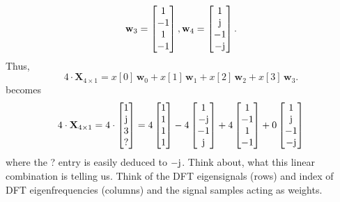 \documentclass[11pt,a4paper,DIV=12]{scrartcl}
\begin{document}
\begin{Loesung}
\begin{enumerate}[label=\alph*)]
\begin{align}
	\mathbf{w}_3 = \begin{bmatrix}1\\-1\\1\\-1\end{bmatrix},
	\mathbf{w}_4 = \begin{bmatrix}1\\\im\\-1\\-\im\end{bmatrix}.
	\end{align}
	Thus,
	\begin{equation}
	4 \cdot \mathbf{X}_{4\times1} = x[0] \, \mathbf{w}_0
	+ x[1] \,\mathbf{w}_1
	+ x[2] \,\mathbf{w}_2
	+ x[3] \,\mathbf{w}_3.
	\end{equation}
	becomes
	\begin{equation}
	 4 \cdot \mathbf{X}_{4\times1} =
	 4 \cdot \begin{bmatrix}1\\\im\\3\\?\end{bmatrix}=
	 4\begin{bmatrix}1\\1\\1\\1\end{bmatrix}
  -4\begin{bmatrix}1\\-\im\\-1\\\im\end{bmatrix}
  +4\begin{bmatrix}1\\-1\\1\\-1\end{bmatrix}
	+0\begin{bmatrix}1\\\im\\-1\\-\im\end{bmatrix}
	\end{equation}
	where the ? entry is easily deduced to $-\im$.
	Think about, what this linear combination is telling us. Think of the
	DFT eigensignals (rows) and index of DFT eigenfrequencies (columns) and the
	signal samples acting as weights.
\end{enumerate}
\end{Loesung}
\end{document}
